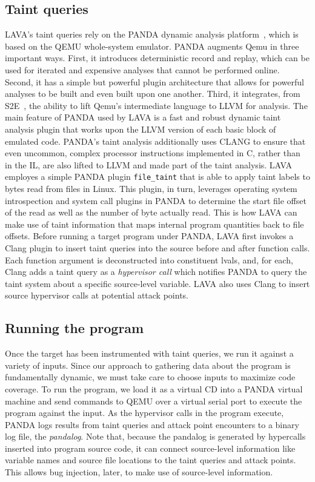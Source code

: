 \subsection{Taint queries}
LAVA's taint queries rely on the PANDA dynamic analysis platform~\cite{panda}, which is based on the QEMU whole-system emulator.
PANDA augments Qemu in three important ways.
First, it introduces deterministic record and replay, which can be used for iterated and expensive analyses that cannot be performed online.
Second, it has a simple but powerful plugin architecture that allows for powerful analyses to be built and even built upon one another.
Third, it integrates, from S2E~\cite{S2E}, the ability to lift Qemu's intermediate language to LLVM for analysis.
The main feature of PANDA used by LAVA is a fast and robust dynamic taint analysis plugin that works upon the LLVM version of each 
basic block of emulated code.
PANDA's taint analysis additionally uses CLANG to ensure that even uncommon, complex processor instructions implemented in C, rather than in the IL, are also lifted to LLVM and made part of the taint analysis.
LAVA employes a simple PANDA plugin \verb+file_taint+ that is able to apply taint labels to bytes read from files in Linux.
This plugin, in turn, leverages operating system introspection and system call plugins in PANDA to determine the start file offset of the read as well as the number of byte actually read.
This is how LAVA can make use of taint information that maps internal program quantities back to file offsets.  
Before running a target program under PANDA, LAVA first invokes a Clang plugin to insert taint queries into the source before and after function calls.
Each function argument is deconstructed into constituent lvals, and, for each, Clang adds a taint query as a \emph{hypervisor call} which notifies PANDA to query the taint system about a specific source-level variable.
LAVA also uses Clang to insert source hypervisor calls at potential attack points.

\subsection{Running the program}
Once the target has been instrumented with taint queries, we run it against a variety of inputs.
Since our approach to gathering data about the program is fundamentally dynamic, we must take care to choose inputs to maximize code coverage.
To run the program, we load it as a virtual CD into a PANDA virtual machine and send commands to QEMU over a virtual serial port to execute the program against the input.
As the hypervisor calls in the program execute, PANDA logs results from taint queries and attack point encounters to a binary log file, the \emph{pandalog}.
Note that, because the pandalog is generated by hypercalls inserted into program source code, it can connect source-level information like variable names and source file locations to the taint queries and attack points.
This allows bug injection, later, to make use of source-level information. 


